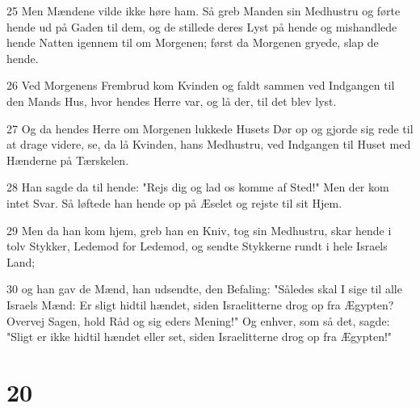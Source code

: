 \par 25 Men Mændene vilde ikke høre ham. Så greb Manden sin Medhustru og førte hende ud på Gaden til dem, og de stillede deres Lyst på hende og mishandlede hende Natten igennem til om Morgenen; først da Morgenen gryede, slap de hende.
\par 26 Ved Morgenens Frembrud kom Kvinden og faldt sammen ved Indgangen til den Mands Hus, hvor hendes Herre var, og lå der, til det blev lyst.
\par 27 Og da hendes Herre om Morgenen lukkede Husets Dør op og gjorde sig rede til at drage videre, se, da lå Kvinden, hans Medhustru, ved Indgangen til Huset med Hænderne på Tærskelen.
\par 28 Han sagde da til hende: "Rejs dig og lad os komme af Sted!" Men der kom intet Svar. Så løftede han hende op på Æselet og rejste til sit Hjem.
\par 29 Men da han kom hjem, greb han en Kniv, tog sin Medhustru, skar hende i tolv Stykker, Ledemod for Ledemod, og sendte Stykkerne rundt i hele Israels Land;
\par 30 og han gav de Mænd, han udsendte, den Befaling: "Således skal I sige til alle Israels Mænd: Er sligt hidtil hændet, siden Israelitterne drog op fra Ægypten? Overvej Sagen, hold Råd og sig eders Mening!" Og enhver, som så det, sagde: "Sligt er ikke hidtil hændet eller set, siden Israelitterne drog op fra Ægypten!"

\chapter{20}

